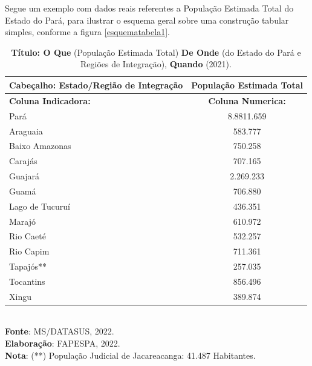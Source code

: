 Segue um exemplo com dados reais referentes a População Estimada Total do Estado do Pará, para ilustrar o esquema geral sobre uma construção tabular simples, conforme a figura \ref{esquematabela1}.



\begin{table}[!htb]
    \centering
    {
    \caption{\textbf{Título: O Que} (População Estimada Total) \textbf{De Onde} (do Estado do Pará e Regiões de Integração), \textbf{Quando} (2021).}
    \label{amostras estratificada}
    \vspace{0.1cm}
\begin{tabular}{l|c}
  \hline\hline
  \textbf{Cabeçalho}: Estado/Região de Integração   & População Estimada Total \\
  \hline\hline
\textbf{Coluna Indicadora:}       & \textbf{Coluna Numerica:}   \\
       Pará                       &  8.8811.659   \\
   Araguaia                       &   583.777    \\
   Baixo Amazonas                 &   750.258    \\
   Carajás                        &   707.165    \\
   Guajará                        & 2.269.233    \\ 
   Guamá                          & 706.880      \\
   Lago de Tucuruí                & 436.351      \\
   Marajó                         & 610.972      \\
   Rio Caeté                      & 532.257      \\
   Rio Capim                      & 711.361      \\
   Tapajós**                      & 257.035      \\
   Tocantins                      & 856.496      \\
   Xingu                          & 389.874      \\
   \hline\hline
\end{tabular}}
\\
\hspace{-7cm}
\textbf{Fonte}: MS/DATASUS, 2022. \\
\hspace{-6.9cm}
\textbf{Elaboração}: FAPESPA, 2022. \\
\hspace{-1.3cm}
\textbf{Nota}: (**) População Judicial de Jacareacanga: 41.487 Habitantes.
\end{table}








